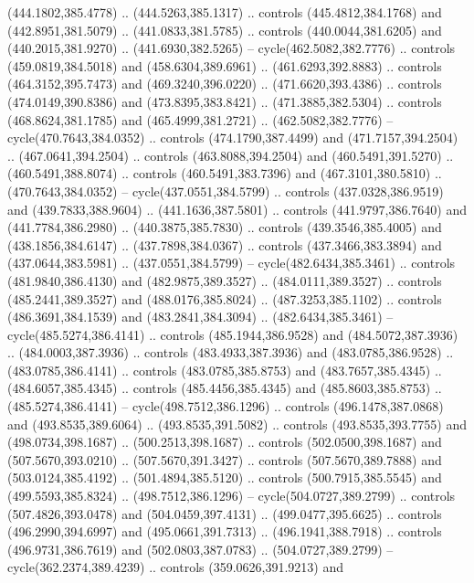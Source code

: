 \begin{scope}[cm={{1.25,0.0,0.0,-1.25,(0.0,743.43331)}}]
    (444.1802,385.4778) .. (444.5263,385.1317) .. controls (445.4812,384.1768) and
    (442.8951,381.5079) .. (441.0833,381.5785) .. controls (440.0044,381.6205) and
    (440.2015,381.9270) .. (441.6930,382.5265) -- cycle(462.5082,382.7776) ..
    controls (459.0819,384.5018) and (458.6304,389.6961) .. (461.6293,392.8883) ..
    controls (464.3152,395.7473) and (469.3240,396.0220) .. (471.6620,393.4386) ..
    controls (474.0149,390.8386) and (473.8395,383.8421) .. (471.3885,382.5304) ..
    controls (468.8624,381.1785) and (465.4999,381.2721) .. (462.5082,382.7776) --
    cycle(470.7643,384.0352) .. controls (474.1790,387.4499) and
    (471.7157,394.2504) .. (467.0641,394.2504) .. controls (463.8088,394.2504) and
    (460.5491,391.5270) .. (460.5491,388.8074) .. controls (460.5491,383.7396) and
    (467.3101,380.5810) .. (470.7643,384.0352) -- cycle(437.0551,384.5799) ..
    controls (437.0328,386.9519) and (439.7833,388.9604) .. (441.1636,387.5801) ..
    controls (441.9797,386.7640) and (441.7784,386.2980) .. (440.3875,385.7830) ..
    controls (439.3546,385.4005) and (438.1856,384.6147) .. (437.7898,384.0367) ..
    controls (437.3466,383.3894) and (437.0644,383.5981) .. (437.0551,384.5799) --
    cycle(482.6434,385.3461) .. controls (481.9840,386.4130) and
    (482.9875,389.3527) .. (484.0111,389.3527) .. controls (485.2441,389.3527) and
    (488.0176,385.8024) .. (487.3253,385.1102) .. controls (486.3691,384.1539) and
    (483.2841,384.3094) .. (482.6434,385.3461) -- cycle(485.5274,386.4141) ..
    controls (485.1944,386.9528) and (484.5072,387.3936) .. (484.0003,387.3936) ..
    controls (483.4933,387.3936) and (483.0785,386.9528) .. (483.0785,386.4141) ..
    controls (483.0785,385.8753) and (483.7657,385.4345) .. (484.6057,385.4345) ..
    controls (485.4456,385.4345) and (485.8603,385.8753) .. (485.5274,386.4141) --
    cycle(498.7512,386.1296) .. controls (496.1478,387.0868) and
    (493.8535,389.6064) .. (493.8535,391.5082) .. controls (493.8535,393.7755) and
    (498.0734,398.1687) .. (500.2513,398.1687) .. controls (502.0500,398.1687) and
    (507.5670,393.0210) .. (507.5670,391.3427) .. controls (507.5670,389.7888) and
    (503.0124,385.4192) .. (501.4894,385.5120) .. controls (500.7915,385.5545) and
    (499.5593,385.8324) .. (498.7512,386.1296) -- cycle(504.0727,389.2799) ..
    controls (507.4826,393.0478) and (504.0459,397.4131) .. (499.0477,395.6625) ..
    controls (496.2990,394.6997) and (495.0661,391.7313) .. (496.1941,388.7918) ..
    controls (496.9731,386.7619) and (502.0803,387.0783) .. (504.0727,389.2799) --
    cycle(362.2374,389.4239) .. controls (359.0626,391.9213) and

\end{scope}
